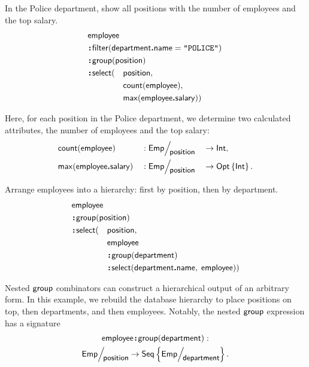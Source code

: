 \begin{demo}
    \label{ex:employee-group-position-etc}
    In the Police department, show all positions with the number of employees
    and the top salary.
    \begin{alignat*}{2}
        & \Employee\hidewidth && \\
        & \Apply\Filter(\Department\To\Name = \textliteral{POLICE})\hspace{-15em}&&\hspace{12em} \\
        & \Apply\Group(\Position)\hidewidth && \\
        & \Apply\Select(&& \Position, \\
        & && \Count(\Employee), \\
        & && \Max(\Employee\To\Salary))
    \end{alignat*}
\end{demo}

Here, for each position in the Police department, we determine two calculated
attributes, the number of employees and the top salary:
\begin{alignat*}{3}
    & \Count(\Employee) && : \Quotient{\Emp}{\Position} && \to \Int, \\
    & \Max(\Employee\To\Salary) && : \Quotient{\Emp}{\Position} && \to \Opt{\Int}.
\end{alignat*}

\begin{demo}
    \label{ex:nested-group}
    Arrange employees into a hierarchy: first by position, then by department.
    \begin{alignat*}{2}
        & \Employee\hidewidth && \\
        & \Apply\Group(\Position)\hidewidth && \\
        & \Apply\Select(&& \Position, \\
        & && \Employee \\
        & && \Apply\Group(\Department) \\
        & && \Apply\Select(\Department\To\Name,\; \Employee))
    \end{alignat*}
\end{demo}

Nested $\textup{\textsf{group}}$ combinators can construct a hierarchical output of an arbitrary
form.  In this example, we rebuild the database hierarchy to place positions on
top, then departments, and then employees.  Notably, the nested $\textup{\textsf{group}}$
expression has a signature
\begin{multline*}
    \Employee\Apply\Group(\Department) : \\
    \Quotient{\Emp}{\Position} \to \Seq{\Quotient{\Emp}{\Department}}.
\end{multline*}

